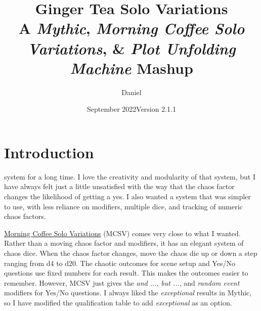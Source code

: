 

\title{
\Huge{Ginger Tea Solo Variations}
\\ \small{A \emph{Mythic}, \emph{Morning Coffee Solo Variations}, \& \emph{Plot Unfolding Machine} Mashup}
}
\date{September 2022\newline{}Version 2.1.1}
\author{Daniel}


\frontmatter
\maketitle


\mainmatter

\section{Introduction}
system for a long time. I love the creativity and modularity of that system,
but I have always felt just a little unsatisfied with the way that the chaos
factor changes the likelihood of getting a yes. I also wanted a system
that was simpler to use, with less reliance on modifiers, multiple dice, and
tracking of numeric chaos factors.

\href{https://aleaiactandaest.blogspot.com/p/downloads.html}{Morning Coffee Solo
Variations} (MCSV) comes very close to what I wanted. Rather than a moving chaos
factor and modifiers, it has an elegant system of chaos dice. When the chaos
factor changes, move the chaos die up or down a step ranging from d4 to d20. The
chaotic outcomes for scene setup and Yes/No questions use fixed numbers for each
result. This makes the outcomes easier to remember. However, MCSV just gives the
\emph{and ...}, \emph{but ...}, and \emph{random event} modifiers for Yes/No
questions. I always liked the \emph{exceptional} results in Mythic, so I have
modified the qualification table to add \emph{exceptional} as an option.

